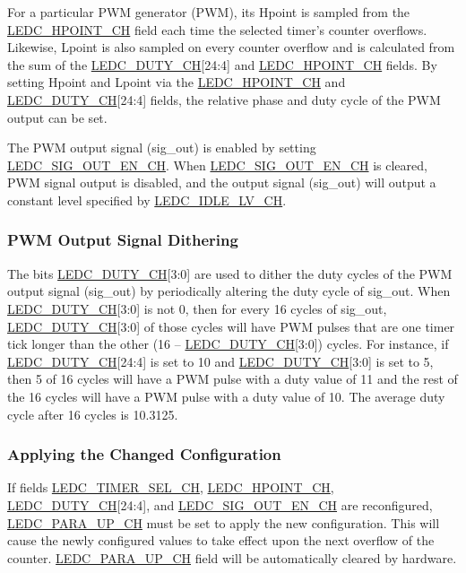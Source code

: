 \documentclass[main\_\_EN.tex]{subfiles}
\begin{document}
For a particular PWM generator (PWM), its Hpoint is sampled from the \hyperref[fielddesc:LEDCHPOINTCHN]{LEDC\_HPOINT\_CH} field each time the selected timer's counter overflows. Likewise, Lpoint is also sampled on every counter overflow and is calculated from the sum of the \hyperref[fielddesc:LEDCDUTYCHN]{LEDC\_DUTY\_CH}[24:4] and \hyperref[fielddesc:LEDCHPOINTCHN]{LEDC\_HPOINT\_CH} fields. By setting Hpoint and Lpoint via the \hyperref[fielddesc:LEDCHPOINTCHN]{LEDC\_HPOINT\_CH} and \hyperref[fielddesc:LEDCDUTYCHN]{LEDC\_DUTY\_CH}[24:4] fields, the relative phase and duty cycle of the PWM output can be set.

The PWM output signal (sig\_out) is enabled by setting \hyperref[fielddesc:LEDCSIGOUTENCHN]{LEDC\_SIG\_OUT\_EN\_CH}. When \hyperref[fielddesc:LEDCSIGOUTENCHN]{LEDC\_SIG\_OUT\_EN\_CH} is cleared, PWM signal output is disabled, and the output signal (sig\_out) will output a constant level specified by \hyperref[fielddesc:LEDCIDLELVCHN]{LEDC\_IDLE\_LV\_CH}.

\subsubsection{PWM Output Signal Dithering}
The bits \hyperref[fielddesc:LEDCDUTYCHN]{LEDC\_DUTY\_CH}[3:0] are used to dither the duty cycles of the PWM output signal (sig\_out) by periodically altering the duty cycle of sig\_out. When \hyperref[fielddesc:LEDCDUTYCHN]{LEDC\_DUTY\_CH}[3:0] is not 0, then for every 16 cycles of sig\_out, \hyperref[fielddesc:LEDCDUTYCHN]{LEDC\_DUTY\_CH}[3:0] of those cycles will have PWM pulses that are one timer tick longer than the other (16 – \hyperref[fielddesc:LEDCDUTYCHN]{LEDC\_DUTY\_CH}[3:0]) cycles. For instance, if \hyperref[fielddesc:LEDCDUTYCHN]{LEDC\_DUTY\_CH}[24:4] is set to 10 and \hyperref[fielddesc:LEDCDUTYCHN]{LEDC\_DUTY\_CH}[3:0] is set to 5, then 5 of 16 cycles will have a PWM pulse with a duty value of 11 and the rest of the 16 cycles will have a PWM pulse with a duty value of 10. The average duty cycle after 16 cycles is 10.3125.

\subsubsection{Applying the Changed Configuration}
If fields \hyperref[fielddesc:LEDCTIMERSELCHN]{LEDC\_TIMER\_SEL\_CH}, \hyperref[fielddesc:LEDCHPOINTCHN]{LEDC\_HPOINT\_CH}, \hyperref[fielddesc:LEDCDUTYCHN]{LEDC\_DUTY\_CH}[24:4], and \hyperref[fielddesc:LEDCSIGOUTENCHN]{LEDC\_SIG\_OUT\_EN\_CH} are reconfigured, \hyperref[fielddesc:LEDCPARAUPCHN]{LEDC\_PARA\_UP\_CH} must be set to apply the new configuration. This will cause the newly configured values to take effect upon the next overflow of the counter. \hyperref[fielddesc:LEDCPARAUPCHN]{LEDC\_PARA\_UP\_CH} field will be automatically cleared by hardware.
\end{document}
